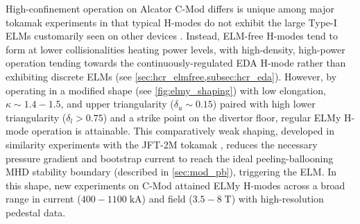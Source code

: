 High-confinement operation on Alcator C-Mod differs is unique among major tokamak experiments in that typical H-modes do not exhibit the large Type-I ELMs customarily seen on other devices \cite{Greenwald2007}.  Instead, ELM-free H-modes tend to form at lower collisionalities heating power levels, with high-density, high-power operation tending towards the continuously-regulated EDA H-mode rather than exhibiting discrete ELMs (see \cref{sec:hcr_elmfree,subsec:hcr_eda}).  However, by operating in a modified shape (see \cref{fig:elmy_shaping}) with low elongation, $\kappa \sim 1.4-1.5$, and upper triangularity ($\delta_u \sim 0.15$) paired with high lower triangularity ($\delta_l > 0.75$) and a strike point on the divertor floor, regular ELMy H-mode operation is attainable.  This comparatively weak shaping, developed in similarity experiments with the JFT-2M tokamak \cite{Hughes2011,Terry2007a}, reduces the necessary pressure gradient and bootstrap current to reach the ideal peeling-ballooning MHD stability 
boundary (described in \cref{sec:mod_pb}), triggering the ELM.  In this shape, new experiments on C-Mod \cite{Walk2012} attained ELMy H-modes across a broad range in current ($400-1100 \;\si{\kilo\ampere}$) and field ($3.5-8 \;\si{\tesla}$) with high-resolution pedestal data.

\begin{figure}[t]
 \pushtooutside
\end{figure}

